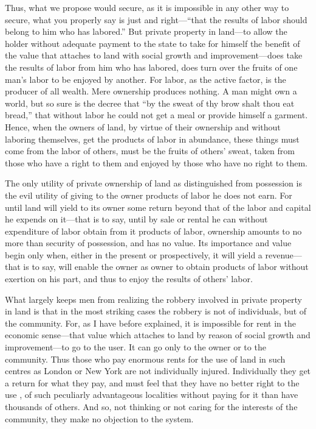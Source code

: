 \documentclass{book}
\begin{document}
Thus, what we propose would secure, as it is impossible in any other way to secure, what you properly say is just and right—“that the results of labor should belong to him who has labored.” But private property in land—to allow the holder without adequate payment to the state to take for himself the benefit of the value that attaches to land with social growth and improvement—does take the results of labor from him who has labored, does turn over the fruits of one man’s labor to be enjoyed by another. For labor, as the active factor, is the producer of all wealth. Mere ownership produces nothing. A man might own a world, but so sure is the decree that “by the sweat of thy brow shalt thou eat bread,” that without labor he could not get a meal or provide himself a garment. Hence, when the owners of land, by virtue of their ownership and without laboring themselves, get the products of labor in abundance, these things must come from the labor of others, must be the fruits of others’ sweat, taken from those who have a right to them and enjoyed by those who have no right to them.

The only utility of private ownership of land as distinguished from possession is the evil utility of giving to the owner products of labor he does not earn. For until land will yield to its owner some return beyond that of the labor and capital he expends on it—that is to say, until by sale or rental he can without expenditure of labor obtain from it products of labor, ownership amounts to no more than security of possession, and has no value. Its importance and value begin only when, either in the present or prospectively, it will yield a revenue—that is to say, will enable the owner as owner to obtain products of labor without exertion on his part, and thus to enjoy the results of others’ labor.

What largely keeps men from realizing the robbery involved in private property in land is that in the most striking cases the robbery is not of individuals, but of the community. For, as I have before explained, it is impossible for rent in the economic sense—that value which attaches to land by reason of social growth and improvement—to go to the user. It can go only to the owner or to the community. Thus those who pay enormous rents for the use of land in such centres as London or New York are not individually injured. Individually they get a return for what they pay, and must feel that they have no better right to the use , of such peculiarly advantageous localities without paying for it than have thousands of others. And so, not thinking or not caring for the interests of the community, they make no objection to the system.
\end{document}
